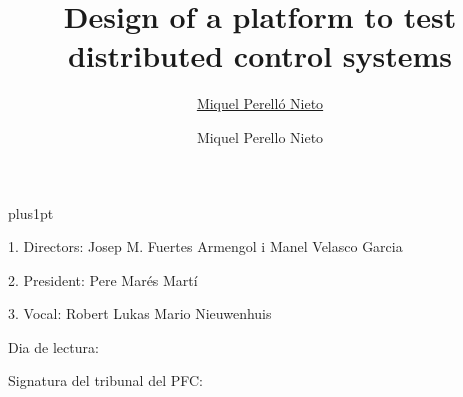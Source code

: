 \documentclass[twoside,11pt]{Latex/Classes/PhDthesisPSnPDF}
\title{Design of a platform to test distributed control systems}
\author{\href{mailto:miquel.perello.nieto@fib.upc.edu}{Miquel Perelló Nieto}}
\author{Miquel Perello Nieto}
\begin{document}

\renewcommand\baselinestretch{1.2}
\baselineskip=18pt plus1pt



\maketitle  %



\newpage
\vspace{10mm}
1. Directors: Josep M. Fuertes Armengol i Manel Velasco Garcia

\vspace{10mm}
2. President: Pere Marés Martí

\vspace{10mm}
3. Vocal: Robert Lukas Mario Nieuwenhuis

\vspace{20mm}
Dia de lectura:

\vspace{20mm}
\hspace{70mm}Signatura del tribunal del PFC:







%   



\frontmatter


\end{document}
